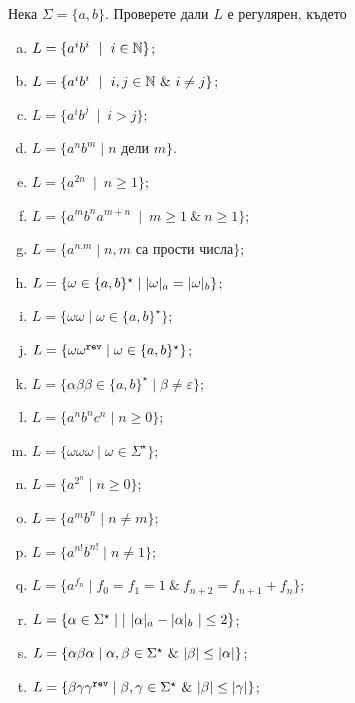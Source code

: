 \begin{extra2}
\begin{problem}
  Нека $\Sigma = \{a,b\}$.  Проверете дали $L$ е регулярен, където
  \begin{enumerate}[a)]
  \item
    $L = \{a^ib^i\ \mid\ i\in\Nat\}$;
  \item
    $L = \{a^ib^i\ \mid\ i,j\in\Nat\ \&\ i\neq j\}$;
  \item
    $L = \{a^ib^j\ \mid\ i > j\}$;
  \item
    $L = \{a^nb^m \mid n\text{ дели }m\}$.
  \item
    $L = \{a^{2n}\ \mid\ n\geq 1\}$;
  \item
    $L = \{a^mb^na^{m+n}\ \mid\ m\geq 1\ \&\ n\geq 1\}$;
  \item
    $L = \{a^{n.m}\mid n,m\text{ са прости числа}\}$;
  \item
    $L = \{\omega\in\{a,b\}^\star \mid \vert{\omega}\vert_{a} = \vert{\omega}\vert_{b}\}$;
  \item
    $L = \{\omega\omega\mid \omega\in\{a,b\}^\star\}$;
  \item
    $L = \{\omega\omega^{\texttt{rev}}\mid \omega\in\{a,b\}^\star\}$;
  \item
    $L = \{\alpha\beta\beta \in \{a,b\}^\star\mid \beta \neq \varepsilon\}$;
  \item
    $L = \{a^nb^nc^n\mid n\geq 0\}$;
  \item
    $L = \{\omega\omega\omega\mid \omega\in \Sigma^\star\}$;
  \item
    $L = \{a^{2^n}\mid n\geq 0\}$;
  \item
    $L = \{a^mb^n\mid n\neq m\}$;
  \item
    $L = \{a^{n!}b^{n!}\mid n\neq 1\}$;
  \item
    $L = \{a^{f_n} \mid f_0 = f_1 = 1\ \&\ f_{n+2} = f_{n+1} + f_{n}\}$;
  \item
    $L = \{\alpha \in \Sigma^\star \mid \vert{\ \vert{\alpha}\vert_{a} - \vert{\alpha}\vert_{b}\ }\vert \leq 2\}$;
  \item
    $L = \{\alpha\beta\alpha \mid \alpha,\beta \in \Sigma^\star\ \&\ \vert{\beta}\vert \leq \vert{\alpha}\vert\}$;
  \item
    $L = \{\beta\gamma\gamma^{\texttt{rev}}\mid \beta, \gamma \in \Sigma^\star\ \&\ \vert{\beta}\vert \leq \vert{\gamma}\vert\}$;

\end{enumerate}
\end{problem}
\end{extra2}
